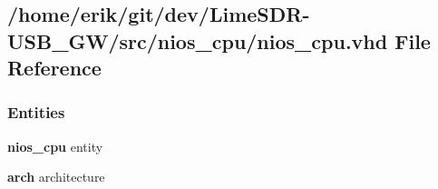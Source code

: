 \subsection{/home/erik/git/dev/\+Lime\+S\+D\+R-\/\+U\+S\+B\+\_\+\+G\+W/src/nios\+\_\+cpu/nios\+\_\+cpu.vhd File Reference}
\label{nios__cpu_8vhd}
\subsubsection*{Entities}
\begin{DoxyCompactItemize}
\item 
{\bf nios\+\_\+cpu} entity
\item 
{\bf arch} architecture
\end{DoxyCompactItemize}
